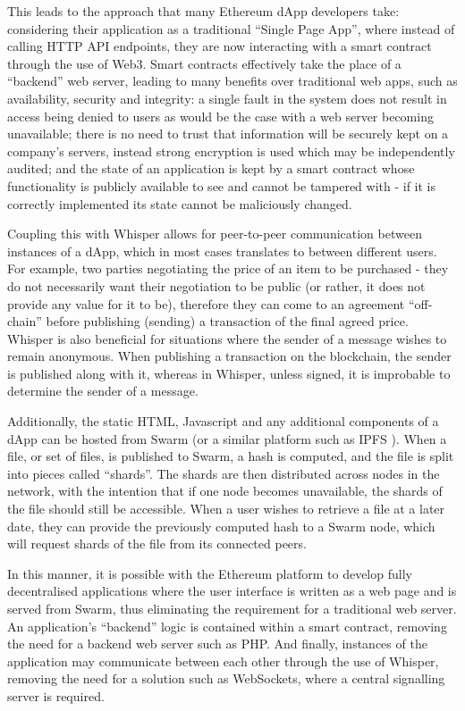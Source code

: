 This leads to the approach that many Ethereum dApp developers take: considering their application as a traditional “Single Page App”, where instead of calling HTTP API endpoints, they are now interacting with a smart contract through the use of Web3. Smart contracts effectively take the place of a “backend” web server, leading to many benefits over traditional web apps, such as availability, security and integrity: a single fault in the system does not result in access being denied to users as would be the case with a web server becoming unavailable; there is no need to trust that information will be securely kept on a company's servers, instead strong encryption is used which may be independently audited; and the state of an application is kept by a smart contract whose functionality is publicly available to see and cannot be tampered with - if it is correctly implemented its state cannot be maliciously changed.

Coupling this with Whisper allows for peer-to-peer communication between instances of a dApp, which in most cases translates to between different users. For example, two parties negotiating the price of an item to be purchased - they do not necessarily want their negotiation to be public (or rather, it does not provide any value for it to be), therefore they can come to an agreement “off-chain” before publishing (sending) a transaction of the final agreed price. Whisper is also beneficial for situations where the sender of a message wishes to remain anonymous. When publishing a transaction on the blockchain, the sender is published along with it, whereas in Whisper, unless signed, it is improbable to determine the sender of a message\cite{WhisperGethWiki}.

Additionally, the static HTML, Javascript and any additional components of a dApp can be hosted from Swarm (or a similar platform such as IPFS \cite{IPFS}). When a file, or set of files, is published to Swarm, a hash is computed, and the file is split into pieces called “shards”. The shards are then distributed across nodes in the network, with the intention that if one node becomes unavailable, the shards of the file should still be accessible. When a user wishes to retrieve a file at a later date, they can provide the previously computed hash to a Swarm node, which will request shards of the file from its connected peers.

In this manner, it is possible with the Ethereum platform to develop fully decentralised applications where the user interface is written as a web page and is served from Swarm, thus eliminating the requirement for a traditional web server. An application’s “backend” logic is contained within a smart contract, removing the need for a backend web server such as PHP. And finally, instances of the application may communicate between each other through the use of Whisper, removing the need for a solution such as WebSockets, where a central signalling server is required.

